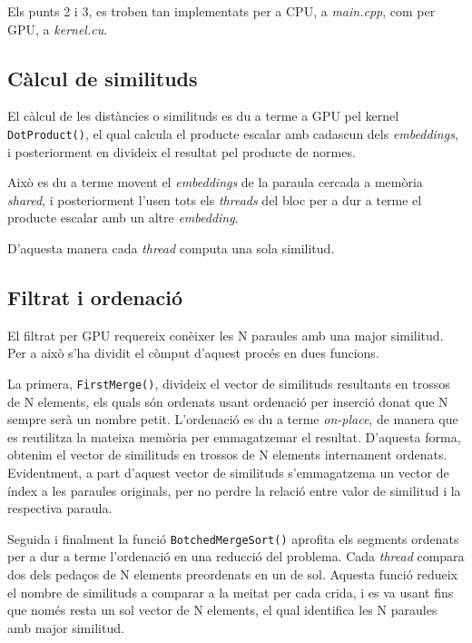\documentclass[catalan,10pt,a4paper]{article}
\begin{document}
	Els punts 2 i 3, es troben tan implementats per a CPU, a \textit{main.cpp}, com per GPU, a \textit{kernel.cu}.
	
	\subsection*{Càlcul de similituds}
	El càlcul de les distàncies o similituds es du a terme a GPU pel kernel \verb|DotProduct()|, el qual calcula el producte escalar amb cadascun dels \textit{embeddings}, i posteriorment en divideix el resultat pel producte de normes.
	
	Això es du a terme movent el \textit{embeddings} de la paraula cercada a memòria \textit{shared}, i posteriorment l'usen tots els \textit{threads} del bloc per a dur a terme el producte escalar amb un altre \textit{embedding}.
	
	D'aquesta manera cada \textit{thread} computa una sola similitud.
	
	\subsection*{Filtrat i ordenació}
	El filtrat per GPU requereix conèixer les N paraules amb una major similitud. Per a això s'ha dividit el còmput d'aquest procés en dues funcions.
	
	La primera, \verb|FirstMerge()|, divideix el vector de similituds resultants en trossos de N elements, els quals són ordenats usant ordenació per inserció donat que N sempre serà un nombre petit. L'ordenació es du a terme \textit{on-place}, de manera que es reutilitza la mateixa memòria per emmagatzemar el resultat.\newline
	D'aquesta forma, obtenim el vector de similituds en trossos de N elements internament ordenats. Evidentment, a part d'aquest vector de similituds s'emmagatzema un vector de índex a les paraules originals, per no perdre la relació entre valor de similitud i la respectiva paraula.
	
	Seguida i finalment la funció \verb|BotchedMergeSort()| aprofita els segments ordenats per a dur a terme l'ordenació en una reducció del problema. Cada \textit{thread} compara dos dels pedaços de N elements preordenats en un de sol.\newline
	Aquesta funció redueix el nombre de similituds a comparar a la meitat per cada crida, i es va usant fins que només resta un sol vector de N elements, el qual identifica les N paraules amb major similitud.
	
\end{document}
